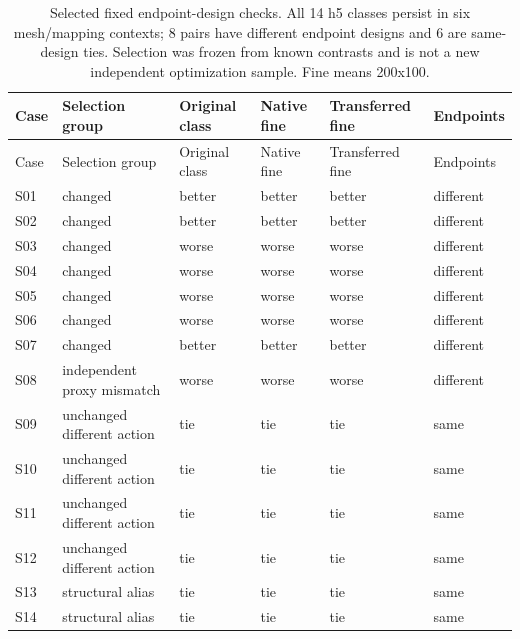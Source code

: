 \FloatBarrier\begingroup\fontsize{8.5}{10.5}\selectfont\setlength\tabcolsep{3pt}
\begin{longtable}{@{}>{\raggedright\arraybackslash}p{}>{\raggedright\arraybackslash}p{}>{\raggedright\arraybackslash}p{}>{\raggedright\arraybackslash}p{}>{\raggedright\arraybackslash}p{}>{\raggedright\arraybackslash}p{}@{}}
\caption{Selected fixed endpoint-design checks. All 14 h5 classes persist in six mesh/mapping contexts; 8 pairs have different endpoint designs and 6 are same-design ties. Selection was frozen from known contrasts and is not a new independent optimization sample. Fine means 200x100.}\label{tab:extension_mesh}\tabularnewline
\toprule
Case & Selection group & Original class & Native fine & Transferred fine & Endpoints \\
\midrule
\endfirsthead
\toprule
Case & Selection group & Original class & Native fine & Transferred fine & Endpoints \\
\midrule
\endhead
\bottomrule
\endlastfoot
S01 & changed & better & better & better & different \\
S02 & changed & better & better & better & different \\
S03 & changed & worse & worse & worse & different \\
S04 & changed & worse & worse & worse & different \\
S05 & changed & worse & worse & worse & different \\
S06 & changed & worse & worse & worse & different \\
S07 & changed & better & better & better & different \\
S08 & independent proxy mismatch & worse & worse & worse & different \\
S09 & unchanged different action & tie & tie & tie & same \\
S10 & unchanged different action & tie & tie & tie & same \\
S11 & unchanged different action & tie & tie & tie & same \\
S12 & unchanged different action & tie & tie & tie & same \\
S13 & structural alias & tie & tie & tie & same \\
S14 & structural alias & tie & tie & tie & same \\
\end{longtable}
\endgroup

